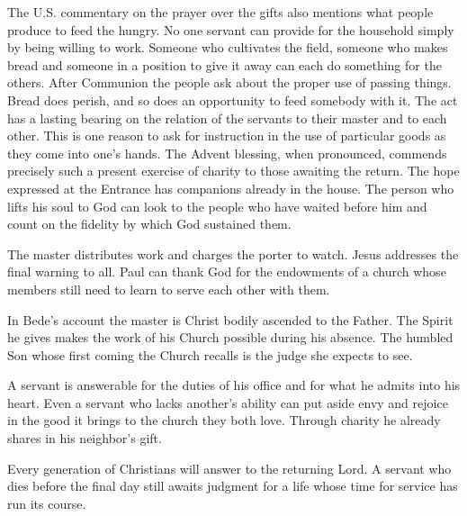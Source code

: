 The U.S. commentary on the prayer over the gifts also mentions what people produce to feed the hungry. No one servant can provide for the household simply by being willing to work. Someone who cultivates the field, someone who makes bread and someone in a position to give it away can each do something for the others. After Communion the people ask about the proper use of passing things. Bread does perish, and so does an opportunity to feed somebody with it. The act has a lasting bearing on the relation of the servants to their master and to each other. This is one reason to ask for instruction in the use of particular goods as they come into one's hands. The Advent blessing, when pronounced, commends precisely such a present exercise of charity to those awaiting the return. The hope expressed at the Entrance has companions already in the house. The person who lifts his soul to God can look to the people who have waited before him and count on the fidelity by which God sustained them.

\begin{fourSenses}
\item[Literal.] The master distributes work and charges the porter to watch. Jesus addresses the final warning to all. Paul can thank God for the endowments of a church whose members still need to learn to serve each other with them.
\item[Allegorical.] In Bede's account the master is Christ bodily ascended to the Father. The Spirit he gives makes the work of his Church possible during his absence. The humbled Son whose first coming the Church recalls is the judge she expects to see.
\item[Moral.] A servant is answerable for the duties of his office and for what he admits into his heart. Even a servant who lacks another's ability can put aside envy and rejoice in the good it brings to the church they both love. Through charity he already shares in his neighbor's gift.
\item[Anagogical.] Every generation of Christians will answer to the returning Lord. A servant who dies before the final day still awaits judgment for a life whose time for service has run its course.
\end{fourSenses}
